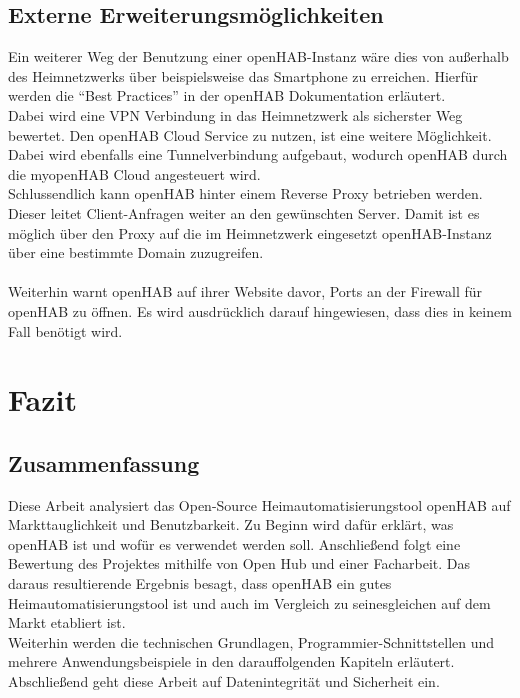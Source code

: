 \subsection{Externe Erweiterungsmöglichkeiten}
Ein weiterer Weg der Benutzung einer openHAB-Instanz wäre dies von außerhalb des Heimnetzwerks über beispielsweise das Smartphone zu erreichen. Hierfür werden die "`Best Practices"' in der openHAB Dokumentation erläutert.\\
Dabei wird eine VPN Verbindung in das Heimnetzwerk als sicherster Weg bewertet. Den openHAB Cloud Service zu nutzen, ist eine weitere Möglichkeit. Dabei wird ebenfalls eine Tunnelverbindung aufgebaut, wodurch openHAB durch die myopenHAB Cloud angesteuert wird.\\
Schlussendlich kann openHAB hinter einem Reverse Proxy betrieben werden. Dieser leitet Client-Anfragen weiter an den gewünschten Server. Damit ist es möglich über den Proxy auf die im Heimnetzwerk eingesetzt openHAB-Instanz über eine bestimmte Domain zuzugreifen.\\
\\
Weiterhin warnt openHAB auf ihrer Website davor, Ports an der Firewall für openHAB zu öffnen. Es wird ausdrücklich darauf hingewiesen, dass dies in keinem Fall benötigt wird.\cite{openHAB03:OH}

\section{Fazit}
\subsection{Zusammenfassung}
Diese Arbeit analysiert das Open-Source Heimautomatisierungstool openHAB auf Markttauglichkeit und Benutzbarkeit. Zu Beginn wird dafür erklärt, was openHAB ist und wofür es verwendet werden soll. Anschließend folgt eine Bewertung des Projektes mithilfe von Open Hub und einer Facharbeit. Das daraus resultierende Ergebnis besagt, dass openHAB ein gutes Heimautomatisierungstool ist und auch im Vergleich zu seinesgleichen auf dem Markt etabliert ist.\\
Weiterhin werden die technischen Grundlagen, Programmier-Schnittstellen und mehrere Anwendungsbeispiele in den darauffolgenden Kapiteln erläutert.\\
Abschließend geht diese Arbeit auf Datenintegrität und Sicherheit ein.

